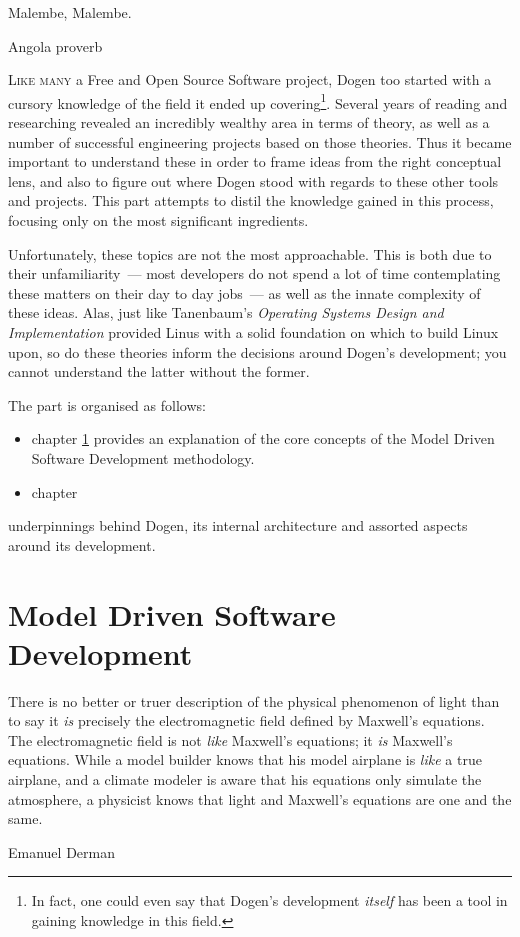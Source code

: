 \documentclass{book}
\begin{document}
\epigraph{Malembe, Malembe.}{Angola proverb}

\lettrine{L}{ike many} a Free and Open Source Software project, Dogen
too started with a cursory knowledge of the field it ended up
covering\footnote{In fact, one could even say that Dogen's development
  \emph{itself} has been a tool in gaining knowledge in this
  field.}. Several years of reading and researching revealed an
incredibly wealthy area in terms of theory, as well as a number of
successful engineering projects based on those theories. Thus it
became important to understand these in order to frame ideas from the
right conceptual lens, and also to figure out where Dogen stood with
regards to these other tools and projects. This part attempts to
distil the knowledge gained in this process, focusing only on the most
significant ingredients.

Unfortunately, these topics are not the most approachable. This is
both due to their unfamiliarity~--- most developers do not spend a lot
of time contemplating these matters on their day to day jobs~--- as
well as the innate complexity of these ideas. Alas, just like
Tanenbaum's \emph{Operating Systems Design and Implementation}
provided Linus with a solid foundation on which to build Linux upon,
so do these theories inform the decisions around Dogen's development;
you cannot understand the latter without the former.

The part is organised as follows:

\begin{itemize}
  \item chapter \ref{mdsd} provides an explanation of the core
    concepts of the Model Driven Software Development methodology.
  \item chapter
\end{itemize}

underpinnings behind Dogen, its internal architecture and assorted
aspects around its development.

\chapter{Model Driven Software Development}
\label{mdsd}

\epigraph{There is no better or truer description of the physical
  phenomenon of light than to say it \emph{is} precisely the
  electromagnetic field defined by Maxwell's equations. The
  electromagnetic field is not \emph{like} Maxwell's equations; it
  \emph{is} Maxwell's equations. While a model builder knows that his
  model airplane is \emph{like} a true airplane, and a climate modeler
  is aware that his equations only simulate the atmosphere, a
  physicist knows that light and Maxwell's equations are one and the
  same.}{Emanuel Derman}
\end{document}
